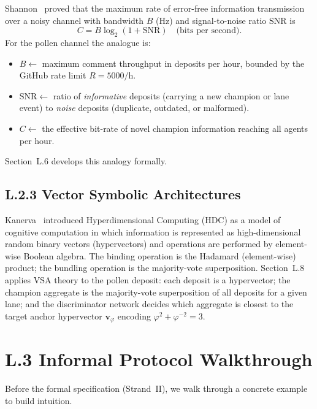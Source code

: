Shannon~\cite{shannon_mathematical} proved that the maximum rate of
error-free information transmission over a noisy channel with
bandwidth $B$ (Hz) and signal-to-noise ratio $\mathrm{SNR}$ is
\[
  C = B \log_{2}(1 + \mathrm{SNR}) \quad \text{(bits per second)}.
\]
For the pollen channel the analogue is:
\begin{itemize}
\item $B \leftarrow$ maximum comment throughput in deposits per hour,
  bounded by the GitHub rate limit $R = 5000/\mathrm{h}$.
\item $\mathrm{SNR} \leftarrow$ ratio of \emph{informative} deposits
  (carrying a new champion or lane event) to \emph{noise} deposits
  (duplicate, outdated, or malformed).
\item $C \leftarrow$ the effective bit-rate of novel champion
  information reaching all agents per hour.
\end{itemize}
Section~L.6 develops this analogy formally.

\subsection*{L.2.3 \quad Vector Symbolic Architectures}

Kanerva~\cite{kanerva_hyperdimensional} introduced Hyperdimensional
Computing (HDC) as a model of cognitive computation in which
information is represented as high-dimensional random binary vectors
(hypervectors) and operations are performed by element-wise Boolean
algebra.  The binding operation is the Hadamard (element-wise)
product; the bundling operation is the majority-vote superposition.
Section~L.8 applies VSA theory to the pollen deposit: each deposit is
a hypervector; the champion aggregate is the majority-vote
superposition of all deposits for a given lane; and the discriminator
network decides which aggregate is closest to the target anchor
hypervector $\mathbf{v}_\varphi$ encoding $\varphi^{2}+\varphi^{-2}=3$.

\section*{L.3 \quad Informal Protocol Walkthrough}
\label{sec:appl-walkthrough}

Before the formal specification (Strand~II), we walk through a
concrete example to build intuition.

